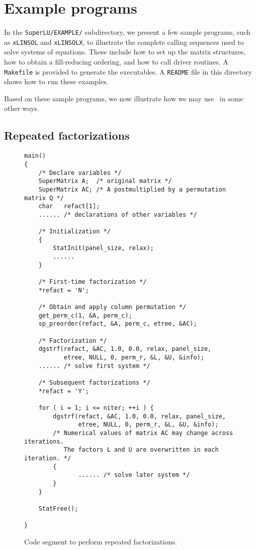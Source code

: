 \section{Example programs}
\label{sec:example}

In the {\tt SuperLU/EXAMPLE/} subdirectory, we present a few sample
programs, such as {\tt xLINSOL} and {\tt xLINSOLX}, to illustrate
the complete calling sequences used to solve systems of equations.
These include how to set up the matrix structures, how to obtain
a fill-reducing ordering, and how to call driver routines.
A {\tt Makefile} is provided to generate the executables.
A {\tt README} file in this directory shows how to run these
examples.

Based on these sample programs, we now illustrate how we may use
\SuperLU\ in some other ways.


\subsection{Repeated factorizations}

\begin{figure}
\begin{verbatim}
main()
{
    /* Declare variables */
    SuperMatrix A;  /* original matrix */
    SuperMatrix AC; /* A postmultiplied by a permutation matrix Q */
    char   refact[1];
    ...... /* declarations of other variables */

    /* Initialization */
    { 
        StatInit(panel_size, relax);
        ......
    }

    /* First-time factorization */
    *refact = 'N';

    /* Obtain and apply column permutation */
    get_perm_c(1, &A, perm_c);
    sp_preorder(refact, &A, perm_c, etree, &AC); 

    /* Factorization */
    dgstrf(refact, &AC, 1.0, 0.0, relax, panel_size,
           etree, NULL, 0, perm_r, &L, &U, &info);
    ...... /* solve first system */

    /* Subsequent factorizations */
    *refact = 'Y';

    for ( i = 1; i <= niter; ++i ) { 
        dgstrf(refact, &AC, 1.0, 0.0, relax, panel_size,
               etree, NULL, 0, perm_r, &L, &U, &info);
        /* Numerical values of matrix AC may change across iterations. 
           The factors L and U are overwritten in each iteration. */
        {
               ...... /* solve later system */
        }  
    }

    StatFree();    

}
\end{verbatim}
\caption{Code segment to perform repeated factorizations.}
\label{fig:repeat}
\end{figure}

